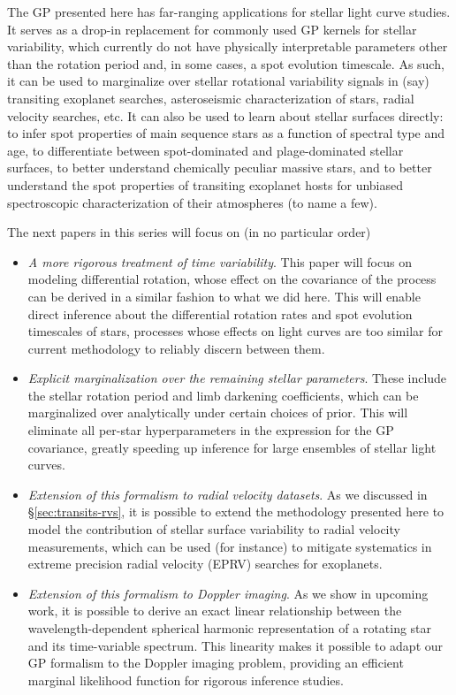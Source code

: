 \documentclass[modern,linenumbers]{aastex62}
\begin{document}
The GP presented here has far-ranging applications for stellar light
curve studies. It serves as a drop-in replacement for commonly used
GP kernels for stellar variability, which currently do not have
physically interpretable parameters other than the rotation
period and, in some cases, a spot evolution timescale.
As such, it can be used to marginalize over stellar rotational variability
signals in (say) transiting exoplanet searches, asteroseismic characterization
of stars, radial velocity searches, etc. It can also be used to learn
about stellar surfaces directly: to infer spot properties of main sequence
stars as a function of spectral type and age, to differentiate between
spot-dominated and plage-dominated stellar surfaces, to better understand
chemically peculiar massive stars, and to better understand the spot
properties of transiting exoplanet hosts for unbiased spectroscopic
characterization of their atmospheres (to name a few).

The next papers in this series will focus on (in no particular order)
\begin{itemize}
    \item \emph{A more rigorous treatment of time variability}.
          This paper will focus
          on modeling differential rotation, whose effect on the covariance of the
          process can be derived in a similar fashion to what we did here. This
          will enable direct inference about the differential rotation rates and
          spot evolution timescales of stars, processes whose effects on light curves
          are too similar for current methodology to reliably discern between them.
    \item \emph{Explicit marginalization over the remaining stellar parameters}.
          These include the stellar rotation period
          and limb darkening coefficients, which can be marginalized over analytically
          under certain choices of prior. This will eliminate all per-star
          hyperparameters in the expression for the GP covariance, greatly
          speeding up inference for large ensembles of stellar light curves.
    \item \emph{Extension of this formalism to radial velocity datasets}.
          As we discussed in \S\ref{sec:transits-rvs}, it is possible to extend
          the methodology presented here to model the contribution of stellar
          surface variability to radial velocity measurements, which can be used
          (for instance) to mitigate systematics in extreme precision radial velocity
          (EPRV) searches for exoplanets.
    \item \emph{Extension of this formalism to Doppler imaging}.
          As we show in upcoming work, it is possible to derive an exact
          linear relationship between the wavelength-dependent spherical harmonic
          representation of a rotating star and its time-variable spectrum.
          This linearity makes it possible to adapt our GP formalism to the Doppler
          imaging problem, providing an efficient marginal likelihood function
          for rigorous inference studies.
\end{itemize}
\end{document}
